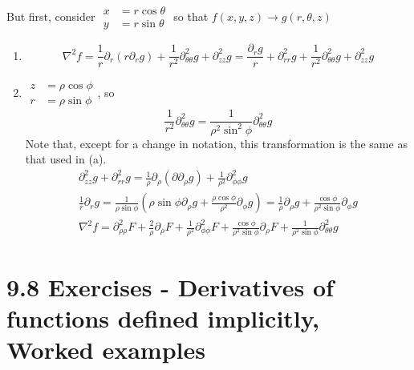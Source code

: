 \documentclass[twoside]{amsart}
\theoremstyle{plain}
\theoremstyle{definition}
\begin{document}
But first, consider $\begin{aligned} x & = r \cos{\theta} \\ y & = r\sin{\theta} \end{aligned}$ so that $f(x,y,z) \to g(r,\theta, z)$ 
\begin{enumerate}
\item \[
\nabla^2 f = \frac{1}{r} \partial_r (r\partial_r g) + \frac{1}{r^2} \partial_{\theta \theta}^2 g + \partial_{zz}^2 g = \frac{ \partial_r g }{r} + \partial_{rr}^2 g + \frac{1}{r^2} \partial_{\theta \theta}^2 g + \partial_{zz}^2 g 
\]
\item $\begin{aligned} z & = \rho \cos{\phi} \\ r & = \rho \sin{\phi} \end{aligned}$, so 
\[
\frac{1}{r^2} \partial_{\theta \theta}^2 g = \frac{1}{ \rho^2 \sin^2{\phi} } \partial_{\theta \theta}^2 g 
\]
Note that, except for a change in notation, this transformation is the same as that used in (a).  
\[
\begin{gathered}
  \partial_{zz}^2 g + \partial_{rr}^2 g = \frac{1}{\rho } \partial_{\rho} (\partial \partial_{\rho} g ) + \frac{1}{\rho^2} \partial_{\phi \phi}^2 g \\
  \frac{1}{r} \partial_r g = \frac{1}{\rho \sin{\phi}} \left( \rho \sin{\phi} \partial_{\rho} g + \frac{\rho \cos{\phi}}{\rho^2} \partial_{\phi} g \right) = \frac{1}{\rho} \partial_{\rho} g + \frac{ \cos{\phi} }{ \rho^2 \sin{\phi} } \partial_{\phi} g \\
  \nabla^2 f = \partial_{\rho \rho}^2 F + \frac{2}{\rho} \partial_{\rho} F + \frac{1}{\rho^2} \partial_{\phi \phi}^2 F + \frac{\cos{\phi} }{ \rho^2 \sin{\phi}} \partial_{\rho} F + \frac{1}{\rho^2 \sin{\phi}} \partial_{\theta \theta}^2 g 
\end{gathered}
\]
\end{enumerate}

\section*{ 9.8 Exercises - Derivatives of functions defined implicitly, Worked examples }
\end{document}
